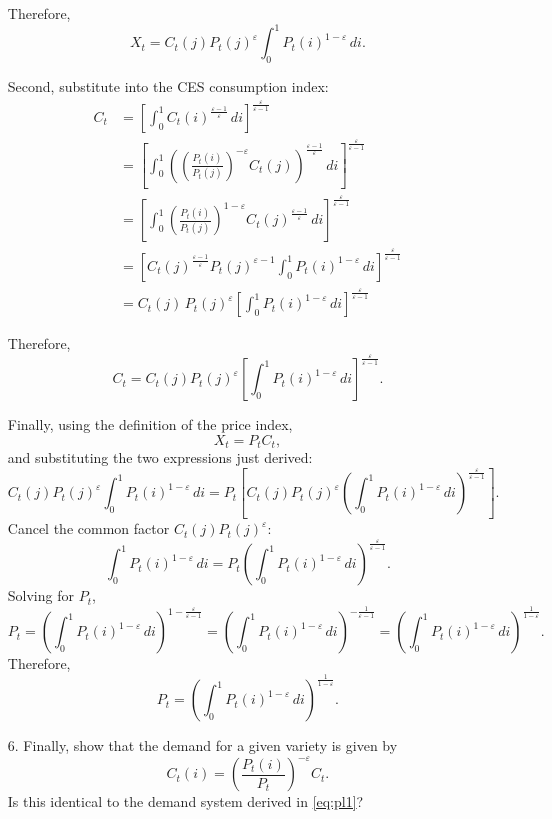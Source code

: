 \documentclass[dvipsnames,11pt]{article}
\begin{document}
\begin{enumerate}
\begin{solution}
Therefore,
\[
X_t=C_t(j)P_t(j)^{\varepsilon}\int_0^1 P_t(i)^{1-\varepsilon}\,di
.
\]

Second, substitute into the CES consumption index:
\begin{align*}
C_t&=\left[\int_0^1 C_t(i)^{\frac{\varepsilon-1}{\varepsilon}}\,di\right]^{\frac{\varepsilon}{\varepsilon-1}} \\
&=\left[\int_0^1 \left(\left(\frac{P_t(i)}{P_t(j)}\right)^{-\varepsilon}C_t(j)\right)^{\frac{\varepsilon-1}{\varepsilon}}\,di\right]^{\frac{\varepsilon}{\varepsilon-1}} \\
& = \left[\int_0^1 \left(\frac{P_t(i)}{P_t(j)}\right)^{1 -\varepsilon}C_t(j)^{\frac{\varepsilon-1}{\varepsilon}}\,di\right]^{\frac{\varepsilon}{\varepsilon-1}} \\
& = \left[
C_t(j)^{\frac{\varepsilon-1}{\varepsilon}}
P_t(j)^{\varepsilon-1}
\int_0^1 P_t(i)^{1-\varepsilon}\,di
\right]^{\frac{\varepsilon}{\varepsilon-1}} \\
& 
=
C_t(j)\,
P_t(j)^{\varepsilon}
\left[\int_0^1 P_t(i)^{1-\varepsilon}\,di\right]^{\frac{\varepsilon}{\varepsilon-1}}
\end{align*}

Therefore,
\[
C_t
=
C_t(j)P_t(j)^{\varepsilon}
\left[\int_0^1 P_t(i)^{1-\varepsilon}\,di\right]^{\frac{\varepsilon}{\varepsilon-1}
}.
\]

Finally, using the definition of the price index,
\[
X_t=P_tC_t,
\]
and substituting the two expressions just derived:
\[
C_t(j)P_t(j)^{\varepsilon}\int_0^1 P_t(i)^{1-\varepsilon}\,di
=
P_t\left[
C_t(j)P_t(j)^{\varepsilon}
\left(\int_0^1 P_t(i)^{1-\varepsilon}\,di\right)^{\frac{\varepsilon}{\varepsilon-1}}
\right].
\]
Cancel the common factor \(C_t(j)P_t(j)^{\varepsilon}\):
\[
\int_0^1 P_t(i)^{1-\varepsilon}\,di
=
P_t
\left(\int_0^1 P_t(i)^{1-\varepsilon}\,di\right)^{\frac{\varepsilon}{\varepsilon-1}}.
\]
Solving for \(P_t\),
\[
P_t
=
\left(\int_0^1 P_t(i)^{1-\varepsilon}\,di\right)^{1-\frac{\varepsilon}{\varepsilon-1}}
=
\left(\int_0^1 P_t(i)^{1-\varepsilon}\,di\right)^{-\frac{1}{\varepsilon-1}}
=
\left(\int_0^1 P_t(i)^{1-\varepsilon}\,di\right)^{\frac{1}{1-\varepsilon}}.
\]
Therefore,
\[
P_t=
\left(\int_0^1 P_t(i)^{1-\varepsilon}\,di\right)^{\frac{1}{1-\varepsilon}
}.
\]

\end{solution}

            \item[6.] Finally, show that the demand for a given variety is given by
            \begin{equation}
            C_{t}(i)=\left( \frac{P_{t}(i)}{P_t}\right) ^{-\varepsilon }C_t.  
            \end{equation}
            Is this identical to the demand system derived in \ref{eq:pl1}? 
            

\end{enumerate}
\end{document}
